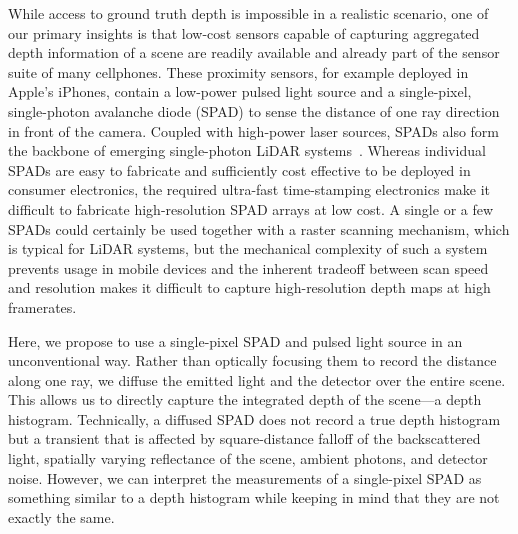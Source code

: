 
While access to ground truth depth is impossible in a realistic scenario, one of our primary insights is that low-cost sensors capable of capturing aggregated depth information of a scene are readily available and already part of the sensor suite of many cellphones. These proximity sensors, for example deployed in Apple's iPhones, contain a low-power pulsed light source and a single-pixel, single-photon avalanche diode (SPAD) to sense the distance of one ray direction in front of the camera. Coupled with high-power laser sources, SPADs also form the backbone of emerging single-photon LiDAR systems~\cite{Kirmani:2014,pawlikowska2017single,Li:2019}. Whereas individual SPADs are easy to fabricate and sufficiently cost effective to be deployed in consumer electronics, the required ultra-fast time-stamping electronics make it difficult to fabricate high-resolution SPAD arrays at low cost. A single or a few SPADs could certainly be used together with a raster scanning mechanism, which is typical for LiDAR systems, but the mechanical complexity of such a system prevents usage in mobile devices and the inherent tradeoff between scan speed and resolution makes it difficult to capture high-resolution depth maps at high framerates.

Here, we propose to use a single-pixel SPAD and pulsed light source in an unconventional way. Rather than optically focusing them to record the distance along one ray, we diffuse the emitted light and the detector over the entire scene. This allows us to directly capture the integrated depth of the scene---a depth histogram. Technically, a diffused SPAD does not record a true depth histogram but a transient that is affected by square-distance falloff of the backscattered light, spatially varying reflectance of the scene, ambient photons, and detector noise. However, we can interpret the measurements of a single-pixel SPAD as something similar to a depth histogram while keeping in mind that they are not exactly the same.

